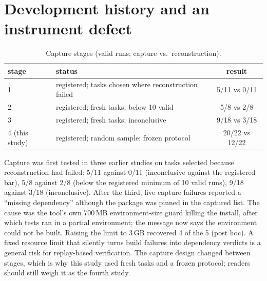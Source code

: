 \documentclass[10pt,conference]{IEEEtran}
\begin{document}
\section{Development history and an instrument defect}
\begin{table}[h]
\centering\caption{Capture stages (valid runs; capture vs.\ reconstruction).}
\begin{tabular}{llc}\toprule stage & status & result\\\midrule
1 & registered; tasks chosen where reconstruction failed & 5/11 vs 0/11\\
2 & registered; fresh tasks; below 10 valid & 5/8 vs 2/8\\
3 & registered; fresh tasks; inconclusive & 9/18 vs 3/18\\
4 (this study) & registered; random sample; frozen protocol & 20/22 vs 12/22\\\bottomrule\end{tabular}
\end{table}
Capture was first tested in three earlier studies on tasks selected because reconstruction had failed: 5/11 against 0/11 (inconclusive against the registered bar), 5/8 against 2/8 (below the registered minimum of 10 valid runs), 9/18 against 3/18 (inconclusive). After the third, five capture failures reported a ``missing dependency'' although the package was pinned in the captured list. The cause was the tool's own 700\,MB environment-size guard killing the install, after which tests ran in a partial environment; the message now says the environment could not be built. Raising the limit to 3\,GB recovered 4 of the 5 (post hoc). A fixed resource limit that silently turns build failures into dependency verdicts is a general risk for replay-based verification. The capture design changed between stages, which is why this study used fresh tasks and a frozen protocol; readers should still weigh it as the fourth study.
\end{document}
